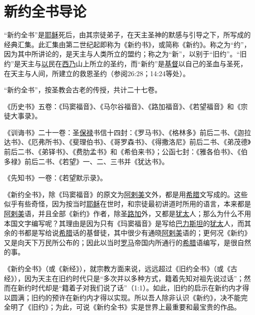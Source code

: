 \chapter*{新约全书导论}


“新约全书”是\uline{耶稣}死后，由其宗徒弟子，在天主圣神的默感与引导之下，所写成的经典汇集。此汇集由第二世纪起即称为《新约书》，或简称《新约》。称之为“约”，因为其中所讲论的，是天主与人类所立的盟约；称之为“新”，以别于“旧约”。“旧约”是天主与\uline{以}民在\uline{西乃}山上所立的圣约，而“新约”是\uline{基督}以自己的圣血与圣死，在天主与人间，所建立的救恩圣约（参阅26:28；14:24等处）。

“新约全书”，按圣教会古老的传授，共计二十七卷。

《历史书》五卷：《玛窦福音》、《马尔谷福音》、《路加福音》、《若望福音》和《宗徒大事录》。

《训诲书》二十一卷：圣\uline{保禄}书信十四封：《罗马书》、《格林多》前后二书、《迦拉达书》、《厄弗所书》、《斐理伯书》、《哥罗森书》、《得撒洛尼》前后二书、《弟茂德》前后二书、《弟铎书》、《费肋孟书》和《希伯来书》；公函七封：《雅各伯书》、《伯多禄》前后二书、《若望》一、二、三书并《犹达书》。

《先知书》一卷：《若望默示录》。

《新约全书》，除《玛窦福音》的原文为\uline{阿剌美}文外，都是用\uline{希腊}文写成的。这些似乎有些奇怪，因为按当时\uline{耶稣}在世时，和宗徒最初讲道时所用的语言，本来都是\uline{阿剌美}语，并且全部《新约》作者，除圣\uline{路加}外，又都是\uline{犹太}人；那么为什么不用本国文字编写呢？其理由是因为只有《玛窦福音》是写给\uline{巴力斯坦}的\uline{犹太}人，而其余的书都是写给说\uline{希腊}话的基督徒，其中很少有通晓\uline{阿剌美}语的；更何况《新约》又是向天下万民所公布的；因此以当时\uline{罗马}帝国内所通行的\uline{希腊}语编写，是很自然的事。

《新约全书》（或《新经》），就宗教方面来说，远远超过《旧约全书》（或《古经》），因为天主在旧约时代只是“多次并以多种方式，籍着先知对祖先说过话”；然而在新约时代却是“籍着子对我们说了话”（1:1）。如此，旧约的启示在新约内才得以圆满；旧约的预许在新约内才得以实现。所以吾人除非认识《新约》，决不能完全明了《旧约》；为此，可说《新约全书》实是世界上最重要和最宝贵的作品。